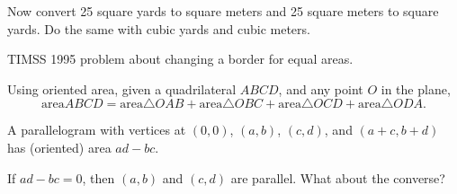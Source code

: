 \begin{prob}
Now convert 25 square yards to square meters and 25 square meters to square yards.  Do the same with cubic yards and cubic meters.
\end{prob}


\begin{prob}
TIMSS 1995 problem about changing a border for equal areas. 
\end{prob}

\begin{prob}
Using oriented area, given a quadrilateral $ABCD$, and any point $O$ in the plane, $$\text{area} ABCD = \text{area}\triangle OAB + \text{area}\triangle OBC + \text{area}\triangle OCD + \text{area}\triangle ODA.$$
\end{prob}
  
\begin{prob}
A parallelogram with vertices at $(0,0)$, $(a,b)$, $(c,d)$, and $(a+c,b+d)$ has (oriented) area $ad-bc$. 
\end{prob}

\begin{prob}
If $ad-bc = 0$, then $(a,b)$ and $(c,d)$ are parallel.  What about the converse?  
\end{prob}

